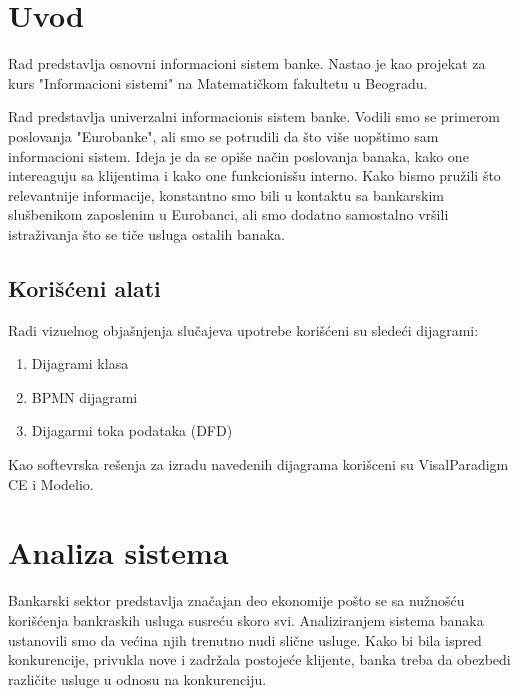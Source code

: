 \documentclass[a4paper]{article}
\begin{document}

\maketitle
\newpage

\section{Uvod}

Rad predstavlja osnovni informacioni sistem banke. Nastao je kao projekat za kurs "Informacioni sistemi" na
Matematičkom fakultetu u Beogradu.

Rad predstavlja univerzalni informacionis sistem banke. Vodili smo se primerom poslovanja "Eurobanke", ali
smo se potrudili da što više uopštimo sam informacioni sistem. Ideja je da se opiše način poslovanja banaka,
kako one intereaguju sa klijentima i kako one funkcionisšu interno. Kako bismo pružili što relevantnije 
informacije, konstantno smo bili u kontaktu sa bankarskim slušbenikom zaposlenim u Eurobanci, ali smo dodatno samostalno
vršili istraživanja što se tiče usluga ostalih banaka.

\subsection{Korišćeni alati}

Radi vizuelnog objašnjenja slučajeva upotrebe korišćeni su sledeći dijagrami:

\begin{enumerate}
\item Dijagrami klasa
\item BPMN dijagrami
\item Dijagarmi toka podataka (DFD)
\end{enumerate}

Kao softevrska rešenja za izradu navedenih dijagrama korišceni su VisalParadigm CE i Modelio.

\section{Analiza sistema}

Bankarski sektor predstavlja značajan deo ekonomije pošto se sa nužnošću korišćenja bankraskih usluga susreću skoro svi.
Analiziranjem sistema banaka ustanovili smo da većina njih trenutno nudi slične usluge. Kako bi bila ispred konkurencije,
privukla nove i zadržala postojeće klijente, banka treba da obezbedi različite usluge u odnosu na konkurenciju.
\end{document}
